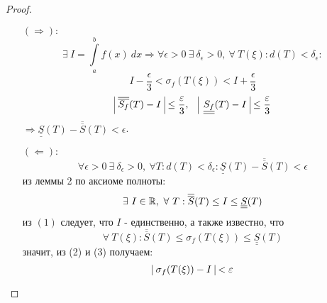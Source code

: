 \begin{proof} \ 
    \begin{itemize}
        \item[$(\Rightarrow):$]
        \[\exists\ I=\int\limits_{a}^{b}f(x)\ dx \Rightarrow \forall \epsilon>0\ \exists\ \delta_{\epsilon}>0,\ \forall\ T(\xi): d(T)<\delta_{\epsilon}:\]
        \[I-\frac{\epsilon}{3}<\sigma_f(T(\xi))<I+\frac{\epsilon}{3}\]
        \[\vline\ \overline{\overline{S_f}}(T)-I\ \vline \leq \frac{\epsilon}{3},\ \ \  \vline\ \underline{\underline{S_f}}(T)-I\ \vline \leq \frac{\epsilon}{3}\]
        $\Rightarrow \underline{\underline{S}}(T)-\overline{\overline{S}}(T)<\epsilon$.
        \item[$(\Leftarrow):$]
        \begin{equation}
            \forall \epsilon>0\ \exists\ \delta_{\epsilon}>0,\ \forall T: d(T)<\delta_{\epsilon}: \underline{\underline{S}}(T)-\overline{\overline{S}}(T)<\epsilon
        \end{equation}
        из леммы 2 по аксиоме полноты: 
        \begin{equation}
            \exists\ I\in \R,\ \forall\ T: \overline{\overline{S}}(T)\leq I\leq\underline{\underline{S}}(T)
        \end{equation}
        из $(1)$ следует, что $I$ - единственно, а также известно, что
        \begin{equation}
            \forall\ T(\xi): \overline{\overline{S}}(T)\leq \sigma_f(T(\xi))\leq \underline{\underline{S}}(T)
        \end{equation}
        значит, из (2) и (3) получаем:
        \[\vline\ \sigma_f(T(\xi))-I \ \vline<\epsilon\]    
    \end{itemize}
\end{proof} 
